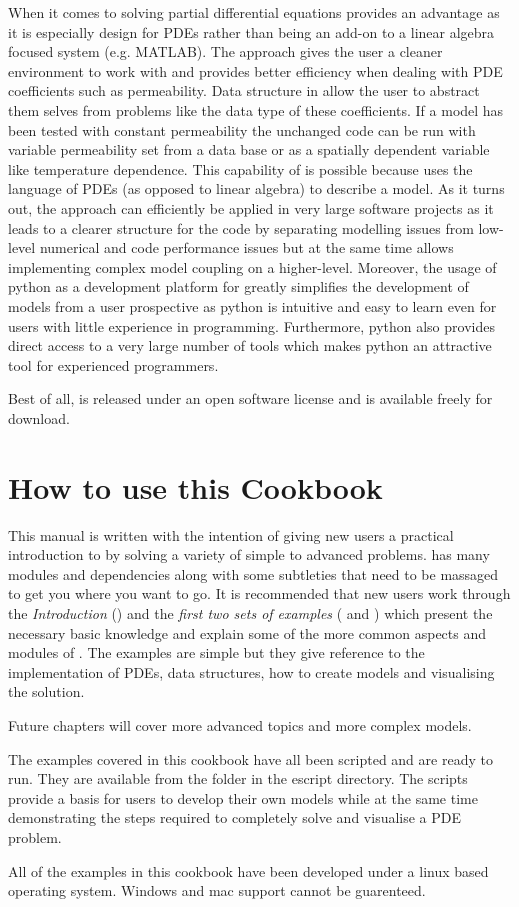 When it comes to solving partial differential equations \esc provides an advantage as it is especially design for PDEs rather than being an add-on to a linear algebra focused system (e.g. MATLAB). The \esc approach gives the user a cleaner environment to work with and provides better efficiency when dealing with PDE coefficients such as permeability. Data structure in \esc allow the user to abstract them selves from problems like the data type of these coefficients. If a model has been tested with constant permeability the unchanged code can be run with variable permeability set from a data base or as a spatially dependent variable like temperature dependence. This capability of \esc is possible because \esc uses the language of PDEs (as opposed to linear algebra) to describe a model. As it turns out, the \esc approach can efficiently be applied in very large software projects as it leads to a clearer structure for the code by separating modelling issues from low-level numerical and code performance issues  but at the same time allows implementing complex model coupling on a higher-level. Moreover, the usage of python as a development platform for \esc greatly simplifies the development of models from a user prospective as python is intuitive and easy to learn even for users with little experience in programming. Furthermore, python also provides direct access to a very large number of tools which makes python an attractive tool for experienced programmers.    

Best of all, \esc is released under an open software license and is available freely for download.

\section{How to use this Cookbook}
This manual is written with the intention of giving new users a practical introduction to \esc by solving a variety of simple to advanced problems. \esc has many modules and dependencies along with some subtleties that need to be massaged to get you where you want to go. It is recommended that new users work through the \textit{Introduction} () and the \textit{first two sets of examples} ( and ) which present the necessary basic knowledge and explain some of the more common aspects and modules of \esc. The examples are simple but they give reference to the implementation of PDEs, data structures, how to create models and visualising the solution.

Future chapters will cover more advanced topics and more complex models.

The examples covered in this cookbook have all been scripted and are ready to run. They are available from the \exf folder in the escript directory. The scripts provide a basis for users to develop their own models while at the same time demonstrating the steps required to completely solve and visualise a PDE problem.

All of the examples in this cookbook have been developed under a linux based operating system. Windows and mac support cannot be guarenteed.



